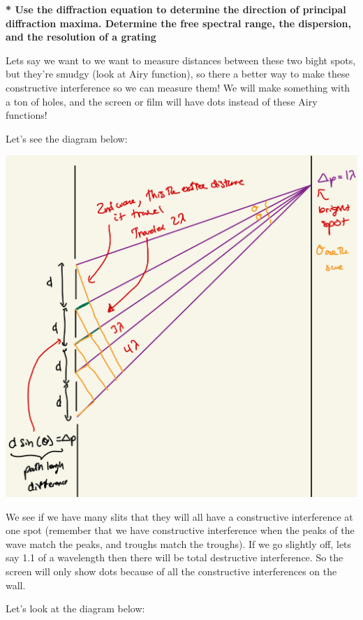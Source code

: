\documentclass[10pt]{article}
\newcommand*{\lo}[1]{
    \textbf{* #1} \newline
}
\begin{document}
\newpage

\lo{Use the diffraction equation to determine the direction of principal diffraction maxima. Determine the free spectral range, the dispersion, and the resolution of a grating}

Lets say we want to we want to measure distances between these two bight spots, but they're smudgy (look at Airy function), so there a better way to make these constructive interference so we can measure them! We will make something with a ton of holes, and the screen or film will have dots instead of these Airy functions!

Let's see the diagram below:

\begin{center}
    \includegraphics[scale = .2]{imgs/grating.jpeg}
\end{center}

We see if we have many slits that they will all have a constructive interference at one spot (remember that we have constructive interference when the peaks of the wave match the peaks, and troughs match the troughs). If we go slightly off, lets say 1.1 of a wavelength then there will be total destructive interference. So the screen will only show dots because of all the constructive interferences on the wall.

\newpage

Let's look at the diagram below:
\end{document}
